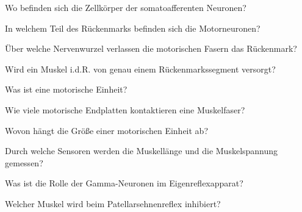 \documentclass[10pt, a4paper]{exam}
\begin{document}
\begin{questions}
\begin{solution}
  \end{solution}

  \question Wo befinden sich die Zellkörper der somatoafferenten Neuronen?
  \begin{solution}

  \end{solution}

  \question In welchem Teil des Rückenmarks befinden sich die Motorneuronen?
  \begin{solution}

  \end{solution}

  \question Über welche Nervenwurzel verlassen die motorischen Fasern das Rückenmark?
  \begin{solution}

  \end{solution}

  \question Wird ein Muskel i.d.R. von genau einem Rückenmarkssegment versorgt?
  \begin{solution}

  \end{solution}

  \question Was ist eine motorische Einheit?
  \begin{solution}

  \end{solution}

  \question Wie viele motorische Endplatten kontaktieren eine Muskelfaser?
  \begin{solution}

  \end{solution}

  \question Wovon hängt die Größe einer motorischen Einheit ab?
  \begin{solution}

  \end{solution}

  \question Durch welche Sensoren werden die Muskellänge und die Muskelspannung gemessen?
  \begin{solution}

  \end{solution}

  \question Was ist die Rolle der Gamma-Neuronen im Eigenreflexapparat?
  \begin{solution}

  \end{solution}

  \question Welcher Muskel wird beim Patellarsehnenreflex inhibiert?
  \begin{solution}


\end{solution}
\end{questions}
\end{document}
